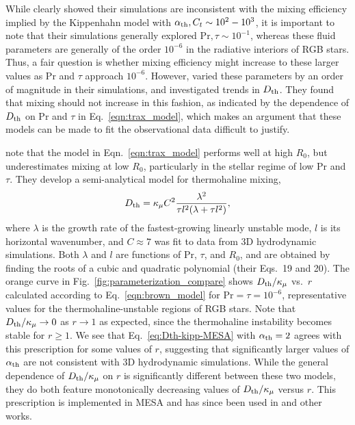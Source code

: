 While \citet{traxler_etal_2011} clearly showed their simulations are inconsistent with the mixing efficiency implied by the Kippenhahn model with $\alpha_{\rm{th}}, C_t \sim 10^2-10^3$, it is important to note that their simulations generally explored $\mathrm{Pr}, \tau \sim 10^{-1}$, whereas these fluid parameters are generally of the order $10^{-6}$ in the radiative interiors of RGB stars. 
Thus, a fair question is whether mixing efficiency might increase to these larger values as $\mathrm{Pr}$ and $\tau$ approach $10^{-6}$. 
However, \citet{traxler_etal_2011} varied these parameters by an order of magnitude in their simulations, and investigated trends in $D_\mathrm{th}$. They found that mixing should not increase in this fashion, as indicated by the dependence of $D_\mathrm{th}$ on $\mathrm{Pr}$ and $\tau$ in Eq.~\eqref{eqn:trax_model}, which makes an argument that these models can be made to fit the observational data difficult to justify. 

\citet{brown_etal_2013} note that the model in Eqn.~\eqref{eqn:trax_model} performs well at high $R_0$, but underestimates mixing at low $R_0$, particularly in the stellar regime of low Pr and $\tau$.
They develop a semi-analytical model for thermohaline mixing,
\begin{equation}
    \Dth = \kappa_{\mu}C^2\frac{\lambda^2}{\tau l^2(\lambda + \tau l^2)},
    \label{eqn:brown_model}
\end{equation}
where $\lambda$ is the growth rate of the fastest-growing linearly unstable mode, $l$ is its horizontal wavenumber, and $C \approx 7$ was fit to data from 3D hydrodynamic simulations.
Both $\lambda$ and $l$ are functions of $\mathrm{Pr}$, $\tau$, and $R_0$, and are obtained by finding the roots of a cubic and quadratic polynomial (their Eqs.~19 and 20).
The orange curve in Fig.~\ref{fig:parameterization_compare} shows $D_\mathrm{th}/\kappa_\mu$ vs.~$r$ calculated according to Eq.~\eqref{eqn:brown_model} for $\mathrm{Pr} = \tau = 10^{-6}$, representative values for the thermohaline-unstable regions of RGB stars. 
Note that $D_\mathrm{th}/\kappa_\mu \to 0$ as $r \to 1$ as expected, since the thermohaline instability becomes stable for $r \geq 1$.
We see that Eq.~\eqref{eq:Dth-kipp-MESA} with $\alpha_{\rm{th}} = 2$ agrees with this prescription for some values of $r$, suggesting that significantly larger values of $\alpha_{\rm{th}}$ are not consistent with 3D hydrodynamic simulations. 
While the general dependence of $D_\mathrm{th}/\kappa_\mu$ on $r$ is significantly different between these two models, they do both feature monotonically decreasing values of $D_\mathrm{th}/\kappa_\mu$ versus $r$. 
This prescription is implemented in MESA and has since been used in \citet{bauer_bildsten_2019} and other works. %


